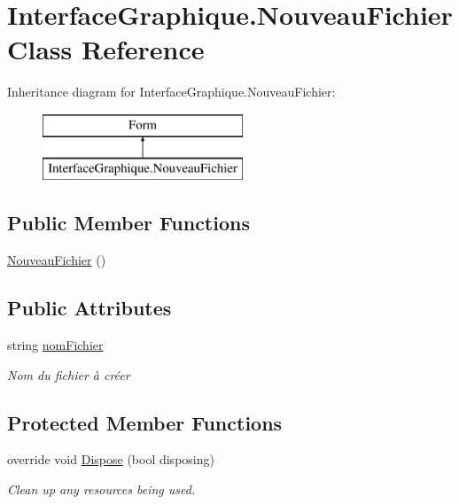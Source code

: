 \hypertarget{class_interface_graphique_1_1_nouveau_fichier}{}\section{Interface\+Graphique.\+Nouveau\+Fichier Class Reference}
\label{class_interface_graphique_1_1_nouveau_fichier}
Inheritance diagram for Interface\+Graphique.\+Nouveau\+Fichier\+:\begin{figure}[H]
\begin{center}
\leavevmode
\includegraphics[height=2.000000cm]{class_interface_graphique_1_1_nouveau_fichier}
\end{center}
\end{figure}
\subsection*{Public Member Functions}
\begin{DoxyCompactItemize}
\item 
\hyperlink{class_interface_graphique_1_1_nouveau_fichier_a27efcb30d7aa214fb6d1466fae5806bd}{Nouveau\+Fichier} ()
\end{DoxyCompactItemize}
\subsection*{Public Attributes}
\begin{DoxyCompactItemize}
\item 
string \hyperlink{class_interface_graphique_1_1_nouveau_fichier_a67f78efe104bcc9d7ad7f2a8e105379a}{nom\+Fichier}
\begin{DoxyCompactList}\small\item\em Nom du fichier à créer \end{DoxyCompactList}\end{DoxyCompactItemize}
\subsection*{Protected Member Functions}
\begin{DoxyCompactItemize}
\item 
override void \hyperlink{class_interface_graphique_1_1_nouveau_fichier_a36b20498dae5da1694f04f00ac42dea3}{Dispose} (bool disposing)
\begin{DoxyCompactList}\small\item\em Clean up any resources being used. \end{DoxyCompactList}\end{DoxyCompactItemize}


